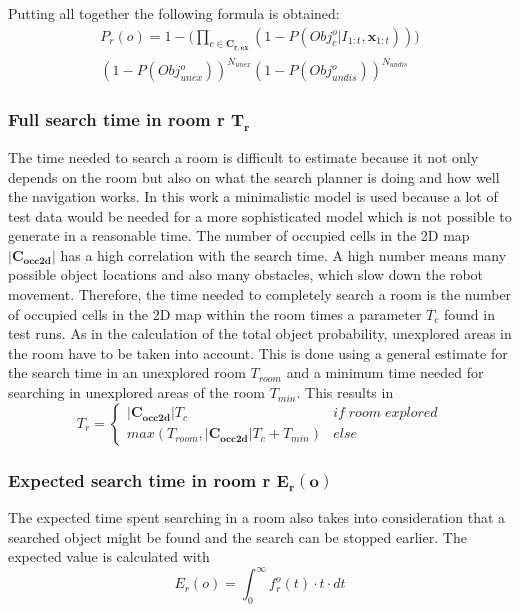 Putting all together the following formula is obtained:
\begin{multline}
 P_r(o)=1-\Big(\prod_{c \in \mathbf{C_{r,ex}}} (1-P(Obj_{c}^{o}|I_{1:t}, \mathbf{x}_{1:t}))\Big)
 \\(1-P(Obj_{unex}^o))^{N_{unex}}(1-P(Obj_{undis}^o))^{N_{undis}} 
\end{multline} 

\subsubsection{Full search time in room r $\mathbf{T_r}$}

The time needed to search a room is difficult to estimate because it not only depends on the room but also on what the search planner is doing and how well the navigation works. In this work a minimalistic model is used because a lot of test data would be needed for a more sophisticated model which is not possible to generate in a reasonable time. The number of occupied cells in the 2D map $|\mathbf{C_{occ2d}}|$ has a high correlation with the search time. A high number means many possible object locations and also many obstacles, which slow down the robot movement. Therefore, the time needed to completely search a room is the number of occupied cells in the 2D map within the room times a parameter $T_c$ found in test runs. As in the calculation of the total object probability, unexplored areas in the room have to be taken into account. This is done using a general estimate for the search time in an unexplored room $T_{room}$ and a minimum time needed for searching in unexplored areas of the room $T_{min}$. This results in
\begin{equation}
 T_r = \begin{cases} |\mathbf{C_{occ2d}}|T_c & if \;room\; explored \\ max(T_{room}, |\mathbf{C_{occ2d}}|T_c+T_{min}) & else \end{cases}
\end{equation}

\subsubsection{Expected search time in room r $\mathbf{E_r(o)}$}

The expected time spent searching in a room also takes into consideration that a searched object might be found and the search can be stopped earlier. The expected value is calculated with
\begin{equation}
 E_r(o) = \int_{0}^\infty f_r^o(t)\cdot t\cdot dt
\end{equation}


